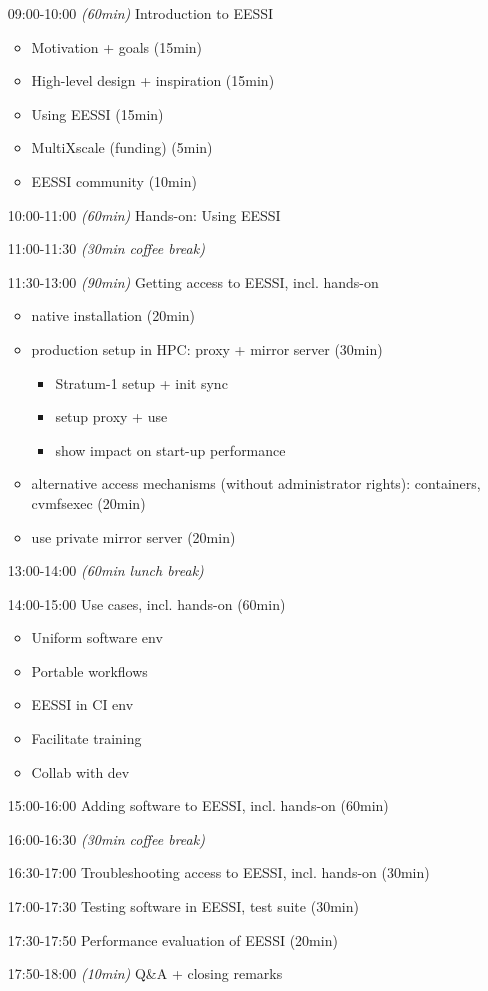 \begin{itemize}[style=standard, labelwidth=1.9cm]
    \item [09:00-10:00] \emph{(60min)} Introduction to EESSI
    \begin{itemize}
        \item Motivation + goals (15min)
        \item High-level design + inspiration (15min)
        \item Using EESSI (15min)
        \item MultiXscale (funding) (5min)
        \item EESSI community (10min)
    \end{itemize}
    \item [10:00-11:00] \emph{(60min)} Hands-on: Using EESSI
    \item [11:00-11:30] \emph{(30min coffee break)}
    \item [11:30-13:00] \emph{(90min)} Getting access to EESSI, incl. hands-on
    \begin{itemize}
        \item native installation (20min)
        \item production setup in HPC: proxy + mirror server (30min)
        \begin{itemize}
            \item Stratum-1 setup + init sync
            \item setup proxy + use
            \item show impact on start-up performance
        \end{itemize}
        \item alternative access mechanisms (without administrator rights): containers, cvmfsexec (20min)
        \item use private mirror server (20min)
    \end{itemize}
    \item [13:00-14:00] \emph{(60min lunch break)}
    \item [14:00-15:00] Use cases, incl. hands-on (60min)
    \begin{itemize}
        \item Uniform software env
        \item Portable workflows
        \item EESSI in CI env
        \item Facilitate training
        \item Collab with dev
    \end{itemize}
    \item [15:00-16:00] Adding software to EESSI, incl. hands-on (60min)
    \item [16:00-16:30] \emph{(30min coffee break)}
    \item [16:30-17:00] Troubleshooting access to EESSI, incl. hands-on (30min)
    \item [17:00-17:30] Testing software in EESSI, test suite (30min)
    \item [17:30-17:50] Performance evaluation of EESSI (20min)
    \item [17:50-18:00] \emph{(10min)} Q\&A + closing remarks


\end{itemize}
